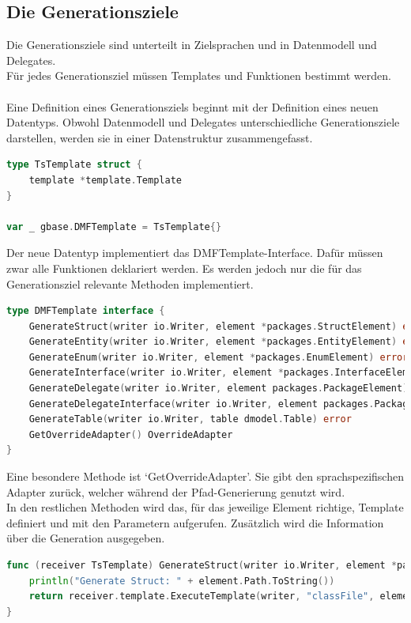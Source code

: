 \documentclass[./einleitung.tex]{subfiles}
\begin{document}
    \subsection{Die Generationsziele}\label{subsec:die-generationsziele}
    Die Generationsziele sind unterteilt in Zielsprachen und in Datenmodell und Delegates.\\
    Für jedes Generationsziel müssen Templates und Funktionen bestimmt werden.
    \\\\
    Eine Definition eines Generationsziels beginnt mit der Definition eines neuen Datentyps.
    Obwohl Datenmodell und Delegates unterschiedliche Generationsziele darstellen, werden sie in einer Datenstruktur zusammengefasst.
    \begin{lstlisting}[language=Go, cation=Definition des Typescript Generationsziel, label=lst:TsTemplate]
type TsTemplate struct {
	template *template.Template
}

var _ gbase.DMFTemplate = TsTemplate{}
    \end{lstlisting}
    Der neue Datentyp implementiert das DMFTemplate-Interface.
    Dafür müssen zwar alle Funktionen deklariert werden.
    Es werden jedoch nur die für das Generationsziel relevante Methoden implementiert.
    \begin{lstlisting}[language=Go, caption=Definition des DMFTemplate-Interfaces, label=lst:DMFTemplate]
type DMFTemplate interface {
	GenerateStruct(writer io.Writer, element *packages.StructElement) error
	GenerateEntity(writer io.Writer, element *packages.EntityElement) error
	GenerateEnum(writer io.Writer, element *packages.EnumElement) error
	GenerateInterface(writer io.Writer, element *packages.InterfaceElement) error
	GenerateDelegate(writer io.Writer, element packages.PackageElement) error
	GenerateDelegateInterface(writer io.Writer, element packages.PackageElement) error
	GenerateTable(writer io.Writer, table dmodel.Table) error
    GetOverrideAdapter() OverrideAdapter
}
    \end{lstlisting}
    Eine besondere Methode ist `GetOverrideAdapter'.
    Sie gibt den sprachspezifischen Adapter zurück, welcher während der Pfad-Generierung genutzt wird.\\
    In den restlichen Methoden wird das, für das jeweilige Element richtige, Template definiert und mit den Parametern aufgerufen.
    Zusätzlich wird die Information über die Generation ausgegeben.
    \begin{lstlisting}[language=Go, caption=Aufruf der Generation einer Typescript Klasse, label=lst:genTsClass]
func (receiver TsTemplate) GenerateStruct(writer io.Writer, element *packages.StructElement) error {
	println("Generate Struct: " + element.Path.ToString())
	return receiver.template.ExecuteTemplate(writer, "classFile", element)
}
    \end{lstlisting}
\end{document}
